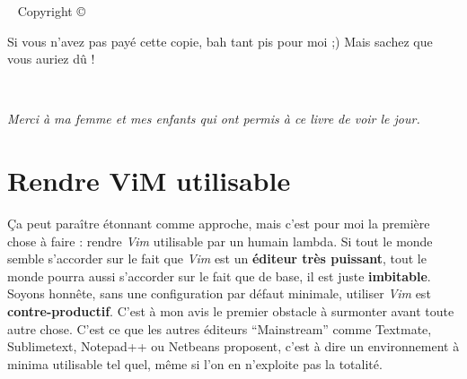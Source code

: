 



\frontmatter

\blankpage

\maketitle


\newpage
\begin{fullwidth}
~\vfill
\thispagestyle{empty}
\setlength{\parindent}{0pt}
\setlength{\parskip}{\baselineskip}
Copyright \copyright\ \the\year\ \thanklessauthor

\par{}

\par{}

\par Si vous n'avez pas payé cette copie, bah tant pis pour moi ;) Mais sachez que vous auriez dû !

\end{fullwidth}

\tableofcontents

\listoffigures

\listoftables

\cleardoublepage
~\vfill
\begin{doublespace}
\noindent\fontsize{18}{22}\selectfont\itshape
\nohyphenation
Merci à ma femme et mes enfants qui ont permis à ce livre de voir le jour.
\end{doublespace}
\vfill
\vfill

\cleardoublepage


\mainmatter

\chapter{Rendre ViM utilisable}

Ça peut paraître étonnant comme approche, mais c'est pour moi la première chose à faire : rendre \emph{Vim} utilisable par un humain lambda. Si tout le monde semble s'accorder sur le fait que \emph{Vim} est un \textbf{éditeur très puissant}, tout le monde pourra aussi s'accorder sur le fait que de base, il est juste \textbf{imbitable}. Soyons honnête, sans une configuration par défaut minimale, utiliser \emph{Vim} est \textbf{contre-productif}. C'est à mon avis le premier obstacle à surmonter avant toute autre chose. C'est ce que les autres éditeurs ``Mainstream'' comme Textmate, Sublimetext, Notepad++ ou Netbeans proposent, c'est à dire un environnement à minima utilisable tel quel, même si l'on en n'exploite pas la totalité.

